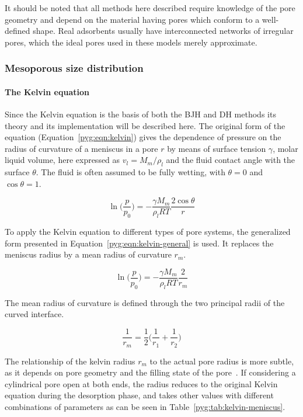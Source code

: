 It should be noted that all methods here described require knowledge of
the pore geometry and depend on the material having pores which
conform to a well-defined shape. Real adsorbents usually have
interconnected networks of irregular pores, which the ideal pores
used in these models merely approximate.

\subsubsection{Mesoporous size distribution}

\paragraph{The Kelvin equation}

Since the Kelvin equation is the basis of both the BJH and DH methods
its theory and its implementation will be described here. The original
form of the equation (Equation~\ref{pyg:eqn:kelvin}) gives the dependence
of pressure on the radius of curvature of a meniscus in a pore \(r\) by
means of surface tension \(\gamma\), molar liquid volume, here expressed
as \(v_l=M_m/\rho_l\) and the fluid contact angle with the surface
\(\theta\). The fluid is often assumed to be fully wetting, with
\(\theta=0\) and \(\cos\theta=1\).

\begin{equation}\label{pyg:eqn:kelvin}
	\ln\Big(\frac{p}{p_0}\Big) = -\frac{\gamma M_m}{\rho_l RT}\frac{2 \cos\theta}{r}
\end{equation}

To apply the Kelvin equation to different types of pore systems, the
generalized form presented in Equation~\ref{pyg:eqn:kelvin-general}
is used. It replaces the meniscus radius by a mean radius of curvature
\(r_m\).

\begin{equation}\label{pyg:eqn:kelvin-general}
	\ln\Big(\frac{p}{p_0}\Big) = -\frac{\gamma M_m}{\rho_l RT}\frac{2}{r_m}
\end{equation}

The mean radius of curvature is defined through the two principal
radii of the curved interface.

\begin{equation}\label{pyg:eqn:kelvin-mradius}
	\frac{1}{r_m} = \frac{1}{2}\Big(\frac{1}{r_1}+\frac{1}{r_2}\Big)
\end{equation}

The relationship of the kelvin radius \(r_m\) to the actual pore
radius is more subtle, as it depends on pore geometry and the
filling state of the pore~\cite{doAdsorptionAnalysisEquilibria1998}.
If considering a cylindrical pore open at both ends, the radius reduces
to the original Kelvin equation during the desorption phase, and takes
other values with different combinations of parameters
as can be seen in Table~\ref{pyg:tab:kelvin-meniscus}.

